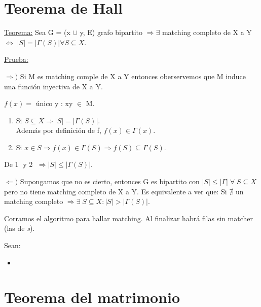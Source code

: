 \documentclass[12pt,a4paper]{report}
\begin{document}
	\section{Teorema de Hall}
	
		\underline{Teorema:} Sea G = (x $\cup$ y, E) grafo bipartito $\Rightarrow \exists$ matching completo de X a Y $\Leftrightarrow \; \lvert S \rvert = \lvert \Gamma(S) \rvert \forall S \subseteq X$.
		
		\underline{Prueba:}

			$\Rightarrow)$ Si M es matching comple de X a Y entonces oberservemos que M induce una función inyectiva de X a Y.
			
			\begin{center}
				$f(x) = $ único y : xy $\in$ M.
			\end{center}
			
			\begin{enumerate}
				\item Si $S \subseteq X \Rightarrow \lvert S \rvert = \lvert \Gamma(S) \rvert$. \\
				
				Además por definición de f, $f(x) \in \Gamma(x)$.
				\item Si $x \in S \Rightarrow f(x) \in \Gamma(S)
				\Rightarrow f(S) \subseteq \Gamma(S)$.
			\end{enumerate}
			
			De \textcircled{1} y \textcircled{2} $\Rightarrow \lvert S \rvert \leq \lvert \Gamma(S) \rvert$.
			
			\vspace{5mm}
			$\Leftarrow)$ Supongamos que no es cierto, entonces G es bipartito con $\lvert S \rvert \leq \lvert \Gamma \rvert \; \forall \; S \subseteq X$ pero no tiene matching completo de X a Y. Es equivalente a ver que: Si $\nexists$ un matching completo $\Rightarrow \exists \; S \subseteq X : \lvert S \rvert > \lvert \Gamma(S) \rvert$.
			
			\vspace{5 mm}
			Corramos el algoritmo para hallar matching. Al finalizar habrá filas sin matcher (las de \textit{s}).
			
			Sean:
			\begin{itemize}
				\item 
			\end{itemize}
	
	\section{Teorema del matrimonio}
	
\end{document}
